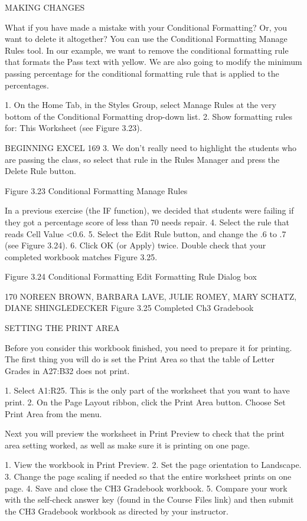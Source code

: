 MAKING CHANGES

What if you have made a mistake with your Conditional Formatting? Or, you want to delete it
altogether? You can use the Conditional Formatting Manage Rules tool. In our example, we want
to remove the conditional formatting rule that formats the Pass text with yellow. We are also going
to modify the minimum passing percentage for the conditional formatting rule that is applied to the
percentages.

1. On the Home Tab, in the Styles Group, select Manage Rules at the very bottom of the
Conditional Formatting drop-down list.
2. Show formatting rules for: This Worksheet (see Figure 3.23).

BEGINNING EXCEL 169
3. We don’t really need to highlight the students who are passing the class, so select that rule in the
Rules Manager and press the Delete Rule button.




Figure 3.23 Conditional Formatting Manage Rules


In a previous exercise (the IF function), we decided that students were failing if they got a
percentage score of less than 70%
needs repair.
4. Select the rule that reads Cell Value <0.6.
5. Select the Edit Rule button, and change the .6 to .7 (see Figure 3.24).
6. Click OK (or Apply) twice. Double check that your completed workbook matches Figure 3.25.




Figure 3.24 Conditional Formatting Edit Formatting Rule Dialog box

170 NOREEN BROWN, BARBARA LAVE, JULIE ROMEY, MARY SCHATZ, DIANE SHINGLEDECKER
Figure 3.25 Completed Ch3 Gradebook


SETTING THE PRINT AREA

Before you consider this workbook finished, you need to prepare it for printing. The first thing you
will do is set the Print Area so that the table of Letter Grades in A27:B32 does not print.

1. Select A1:R25. This is the only part of the worksheet that you want to have print.
2. On the Page Layout ribbon, click the Print Area button. Choose Set Print Area from the menu.

Next you will preview the worksheet in Print Preview to check that the print area setting worked, as
well as make sure it is printing on one page.

1.   View the workbook in Print Preview.
2.   Set the page orientation to Landscape.
3.   Change the page scaling if needed so that the entire worksheet prints on one page.
4.   Save and close the CH3 Gradebook workbook.
5.   Compare your work with the self-check answer key (found in the Course Files link) and then
submit the CH3 Gradebook workbook as directed by your instructor.




